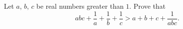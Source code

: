 Let $a$, $b$, $c$ be real numbers greater than $1$. Prove that
\[abc+\dfrac{1}{a}+\dfrac{1}{b}+\dfrac{1}{c}>a+b+c+\dfrac{1}{abc}.\]

